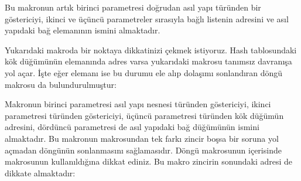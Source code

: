 \documentclass[a4paper,10pt,turkish]{sphinxmanual}
\begin{document}
\begin{sphinxVerbatim}[commandchars=\\\{\}]
\end{sphinxVerbatim}

\sphinxAtStartPar
Bu makronun artık birinci parametresi doğrudan asıl yapı türünden bir göstericiyi, ikinci
ve üçüncü parametreler sırasıyla bağlı listenin  adresini ve asıl yapıdaki
bağ elemanının ismini almaktadır.

\sphinxAtStartPar
Yukarıdaki makroda bir noktaya dikkatinizi çekmek istiyoruz. Hash tablosundaki
 kök düğümünün  elemanında  adres varsa yukarıdaki
 makrosu tanımsız davranışa yol açar. İşte eğer  elemanı
 ise bu durumu ele alıp dolaşımı sonlandıran  döngü
makrosu da bulundurulmuştur:

\begin{sphinxVerbatim}[commandchars=\\\{\}]
\end{sphinxVerbatim}

\sphinxAtStartPar
Makronun birinci parametresi asıl yapı nesnesi türünden göstericiyi, ikinci parametresi
 türünden göstericiyi, üçüncü parametresi  türünden kök düğümün
adresini, dördüncü parametresi de asıl yapıdaki bağ düğümünün ismini almaktadır. Bu
makronun  makrosundan tek farkı zincir boşsa bir soruna yol açmadan
döngünün sonlanmasını sağlamasıdır. Döngü makrosunun içerisinde 
makrosunun kullanıldığına dikkat ediniz. Bu makro zincirin sonundaki  adresi de
dikkate almaktadır:
\end{document}

